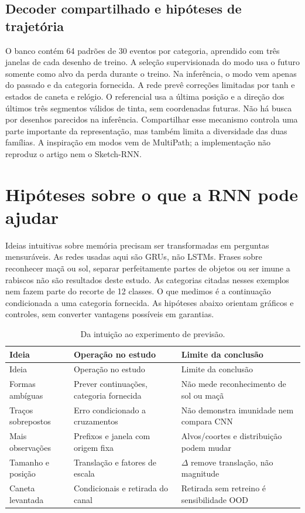\documentclass[11pt,a4paper]{article}
\begin{document}
\subsection{Decoder compartilhado e hipóteses de trajetória}
O banco contém 64 padrões de 30 eventos por categoria, aprendido com três janelas de cada desenho de treino. A seleção supervisionada do modo usa o futuro somente como alvo da perda durante o treino. Na inferência, o modo vem apenas do passado e da categoria fornecida. A rede prevê correções limitadas por tanh e estados de caneta e relógio. O referencial usa a última posição e a direção dos últimos três segmentos válidos de tinta, sem coordenadas futuras. Não há busca por desenhos parecidos na inferência. Compartilhar esse mecanismo controla uma parte importante da representação, mas também limita a diversidade das duas famílias. A inspiração em modos vem de MultiPath; a implementação não reproduz o artigo nem o Sketch-RNN.
\section{Hipóteses sobre o que a RNN pode ajudar}
Ideias intuitivas sobre memória precisam ser transformadas em perguntas mensuráveis. As redes usadas aqui são GRUs, não LSTMs. Frases sobre reconhecer maçã ou sol, separar perfeitamente partes de objetos ou ser imune a rabiscos não são resultados deste estudo. As categorias citadas nesses exemplos nem fazem parte do recorte de 12 classes. O que medimos é a continuação condicionada a uma categoria fornecida. As hipóteses abaixo orientam gráficos e controles, sem converter vantagens possíveis em garantias.
\begingroup\small\setlength{\tabcolsep}{4pt}\begin{longtable}{p{.22\linewidth}p{.34\linewidth}p{.34\linewidth}}
\caption{Da intuição ao experimento de previsão.}\\
\toprule
Ideia & Operação no estudo & Limite da conclusão \\ 
\midrule\endfirsthead
\toprule
Ideia & Operação no estudo & Limite da conclusão \\ 
\midrule\endhead
\bottomrule\endfoot
Formas ambíguas & Prever continuações, categoria fornecida & Não mede reconhecimento de sol ou maçã \\
Traços sobrepostos & Erro condicionado a cruzamentos & Não demonstra imunidade nem compara CNN \\
Mais observações & Prefixos e janela com origem fixa & Alvos/coortes e distribuição podem mudar \\
Tamanho e posição & Translação e fatores de escala & $\Delta$ remove translação, não magnitude \\
Caneta levantada & Condicionais e retirada do canal & Retirada sem retreino é sensibilidade OOD \\
\end{longtable}\endgroup
\end{document}
